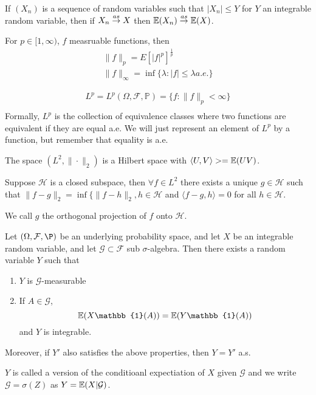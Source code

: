 \begin{thm}
  If $(X_{n})$ is a sequence of random variables such that $|X_{n}|
  \leq Y$ for $Y$ an integrable random variable, then if $X_{n} \overset{as}{\rightarrow}
  X$ then $\E{X_{n}} \cas \E{X}$. 
\end{thm}

\begin{defn}
  \label{defn:9}
  For $p \in [1, \infty)$, $f$ measruable functions, then
  \begin{align}
    \| f \|_{p} = E[|f|^{p}]^{\frac{1}{p}} \\
    \| f \|_{\infty} = \inf \{ \lambda : |f| \leq \lambda a.e. \}
  \end{align}
\end{defn}

\begin{defn}
  \label{defn:10}
  \begin{align*}
    L^{p} = L^{p}(\Omega, \mathcal{F}, \mathbb{P}) = \{ f : \| f
    \|_{p} < \infty \} \\
  \end{align*}
  Formally, $L^{p}$ is the collection of equivalence classes where two
  functions are equivalent if they are equal a.e.  We will just
  represent an element of $L^{p}$ by a function, but remember that
  equality is a.e.
\end{defn}

\begin{thm}
  The space $(L^{2}, \| \cdot \|_{2})$ is a Hilbert space with
  $\langle U, V \rangle> = \E{UV}$.

  Suppose $\mathcal{H}$ is a closed subspace, then $\forall f \in
  L^{2}$ there exists a unique $g \in \mathcal{H}$ such that $\| f - g
  \|_{2} = \inf \{ \| f- h \|_{2}, h \in \mathcal{H}$ and $\langle f
  -g, h \rangle = 0$ for all $h \in \mathcal{H}$.

  We call $g$ the orthogonal projection of $f$ onto $\mathcal{H}$.
\end{thm}


\begin{thm}
  Let $(\Omega, \mathcal{F}, \P)$ be an underlying probability space,
  and let $X$ be an integrable random variable, and let $\mathcal{G}
  \subset \mathcal{F}$ sub $\sigma$-algebra.  Then there exists a
  random variable $Y$ such that
  \begin{enumerate}
  \item $Y$ is $\mathcal{G}$-measurable
  \item If $A \in \mathcal{G}$,
    \begin{equation}
      \label{exmp:general:1}
      \E{X \mathbb{1}(A)} = \E{Y \mathbb{1}(A)}
    \end{equation} and $Y$ is integrable.
  \end{enumerate}
  Moreover, if $Y'$ also satisfies the above properties, then $Y = Y'$ a.s.
\end{thm}
\begin{remark}
  $Y$ is called a version of the conditioanl expectiation of $X$ given
  $\mathcal{G}$ and we write $\mathcal{G} = \sigma(Z)$ as $Y = \E{X |
    \mathcal{G}}$.
\end{remark}


